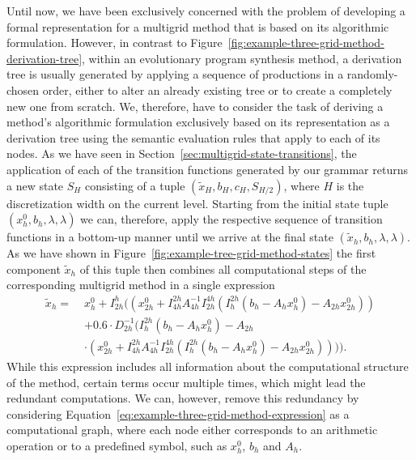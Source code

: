 Until now, we have been exclusively concerned with the problem of developing a formal representation for a multigrid method that is based on its algorithmic formulation.
However, in contrast to Figure~\ref{fig:example-three-grid-method-derivation-tree}, within an evolutionary program synthesis method, a derivation tree is usually generated by applying a sequence of productions in a randomly-chosen order, either to alter an already existing tree or to create a completely new one from scratch.
We, therefore, have to consider the task of deriving a method's algorithmic formulation exclusively based on its representation as a derivation tree using the semantic evaluation rules that apply to each of its nodes.
As we have seen in Section~\ref{sec:multigrid-state-transitions}, the application of each of the transition functions generated by our grammar returns a new state $S_H$ consisting of a tuple $\left( \tilde{x}_{H}, b_{H}, c_{H}, S_{H/2}\right)$, where $H$ is the discretization width on the current level.
Starting from the initial state tuple $\left(x_{h}^0, b_{h}, \lambda, \lambda\right)$ we can, therefore, apply the respective sequence of transition functions in a bottom-up manner until we arrive at the final state $\left(\tilde{x}_{h}, b_{h}, \lambda, \lambda\right)$.
As we have shown in Figure~\ref{fig:example-tree-grid-method-states} the first component $\tilde{x}_{h}$ of this tuple then combines all computational steps of the corresponding multigrid method in a single expression
\begin{equation}
	\begin{split}
		\tilde{x}_h = \; & x_{h}^0 + I_{2h}^h ((x_{2h}^0 + I_{4h}^{2h} A_{4h}^{-1} I_{2h}^{4h} (I_{h}^{2h}(b_{h} - A_h x_{h}^0) - A_{2h} x_{2h}^0)) \\
		& + 0.6 \cdot D_{2h}^{-1} (I_{h}^{2h}(b_{h} - A_h x_{h}^0) - A_{2h} \\
		& \cdot (x_{2h}^0 + I_{4h}^{2h} A_{4h}^{-1} I_{2h}^{4h} (I_{h}^{2h}(b_{h} - A_h x_{h}^0) - A_{2h} x_{2h}^0)))).
		\label{eq:example-three-grid-method-expression}
	\end{split}
\end{equation}
While this expression includes all information about the computational structure of the method, certain terms occur multiple times, which might lead the redundant computations.
We can, however, remove this redundancy by considering Equation~\eqref{eq:example-three-grid-method-expression} as a computational graph, where each node either corresponds to an arithmetic operation or to a predefined symbol, such as $x^0_h$, $b_h$ and $A_h$.
